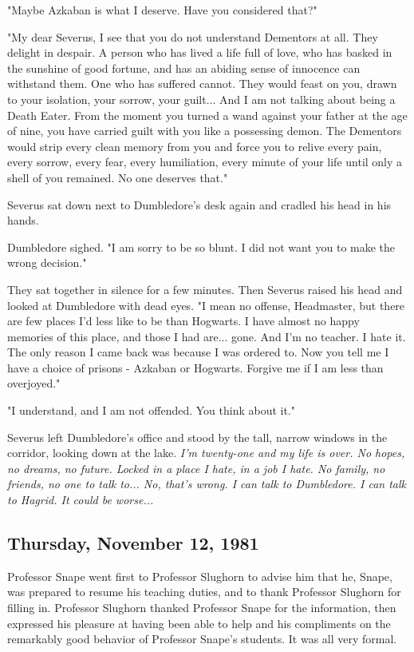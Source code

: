 "Maybe Azkaban is what I deserve. Have you considered that?"

"My dear Severus, I see that you do not understand Dementors at all. They delight in despair. A person who has lived a life full of love, who has basked in the sunshine of good fortune, and has an abiding sense of innocence can withstand them. One who has suffered cannot. They would feast on you, drawn to your isolation, your sorrow, your guilt... And I am not talking about being a Death Eater. From the moment you turned a wand against your father at the age of nine, you have carried guilt with you like a possessing demon. The Dementors would strip every clean memory from you and force you to relive every pain, every sorrow, every fear, every humiliation, every minute of your life until only a shell of you remained. No one deserves that."

Severus sat down next to Dumbledore's desk again and cradled his head in his hands.

Dumbledore sighed. "I am sorry to be so blunt. I did not want you to make the wrong decision."

They sat together in silence for a few minutes. Then Severus raised his head and looked at Dumbledore with dead eyes. "I mean no offense, Headmaster, but there are few places I'd less like to be than Hogwarts. I have almost no happy memories of this place, and those I had are... gone. And I'm no teacher. I hate it. The only reason I came back was because I was ordered to. Now you tell me I have a choice of prisons - Azkaban or Hogwarts. Forgive me if I am less than overjoyed."

"I understand, and I am not offended. You think about it."

Severus left Dumbledore's office and stood by the tall, narrow windows in the corridor, looking down at the lake. \emph{I'm twenty-one and my life is over. No hopes, no dreams, no future. Locked in a place I hate, in a job I hate. No family, no friends, no one to talk to... No, that's wrong. I can talk to Dumbledore. I can talk to Hagrid. It could be worse...}

\subsection{Thursday, November 12, 1981}

Professor Snape went first to Professor Slughorn to advise him that he, Snape, was prepared to resume his teaching duties, and to thank Professor Slughorn for filling in. Professor Slughorn thanked Professor Snape for the information, then expressed his pleasure at having been able to help and his compliments on the remarkably good behavior of Professor Snape's students. It was all very formal.

